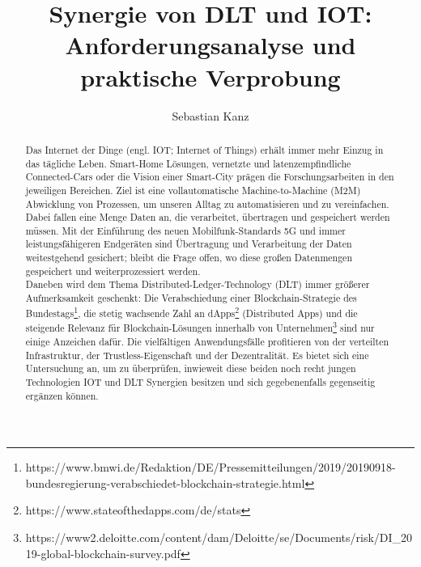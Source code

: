 \documentclass[
    ngerman,american
    ]{scrartcl}
\title{
        Synergie von DLT und IOT: Anforderungsanalyse und praktische Verprobung
        \\  \Large{\paperSubTitle{\lang}}} %
\author{
        Sebastian Kanz
        }
\begin{document}
\maketitle
\begin{abstract}
	Das Internet der Dinge (engl. IOT; Internet of Things) erhält immer mehr Einzug in das tägliche Leben. Smart-Home Lösungen, vernetzte und latenzempfindliche Connected-Cars oder die Vision einer Smart-City prägen die Forschungsarbeiten in den jeweiligen Bereichen. Ziel ist eine vollautomatische Machine-to-Machine (M2M) Abwicklung von Prozessen, um unseren Alltag zu automatisieren und zu vereinfachen. Dabei fallen eine Menge Daten an, die verarbeitet, übertragen und gespeichert werden müssen. Mit der Einführung des neuen Mobilfunk-Standards 5G und immer leistungsfähigeren Endgeräten sind Übertragung und Verarbeitung der Daten weitestgehend gesichert; bleibt die Frage offen, wo diese großen Datenmengen gespeichert und weiterprozessiert werden.\\
	Daneben wird dem Thema Distributed-Ledger-Technology (DLT) immer größerer Aufmerksamkeit geschenkt: Die Verabschiedung einer Blockchain-Strategie des Bundestags\footnote{https://www.bmwi.de/Redaktion/DE/Pressemitteilungen/2019/20190918-bundesregierung-verabschiedet-blockchain-strategie.html}, die stetig wachsende Zahl an dApps\footnote{https://www.stateofthedapps.com/de/stats} (Distributed Apps) und die steigende Relevanz für Blockchain-Lösungen innerhalb von Unternehmen\footnote{https://www2.deloitte.com/content/dam/Deloitte/se/Documents/risk/DI\_2019-global-blockchain-survey.pdf} sind nur einige Anzeichen dafür. Die vielfältigen Anwendungsfälle profitieren von der verteilten Infrastruktur, der Trustless-Eigenschaft und der Dezentralität. Es bietet sich eine Untersuchung an, um zu überprüfen, inwieweit diese beiden noch recht jungen Technologien IOT und DLT Synergien besitzen und sich gegebenenfalls gegenseitig ergänzen können.

\end{abstract}
\end{document}
